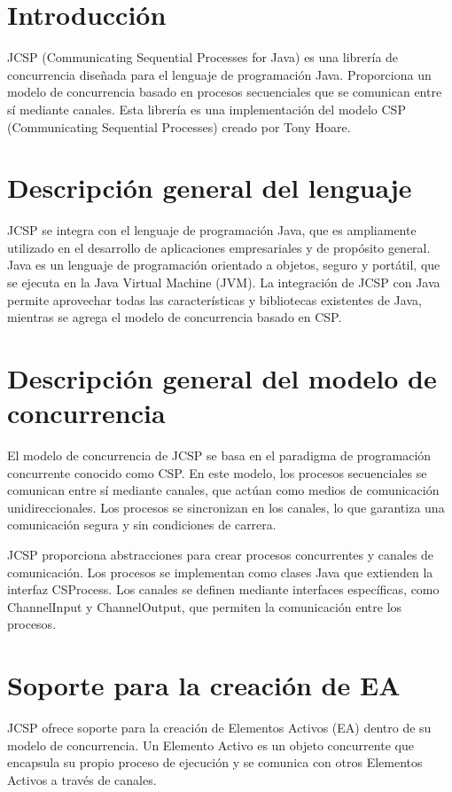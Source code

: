 \section*{Introducción}

JCSP (Communicating Sequential Processes for Java) es una librería de concurrencia diseñada para el lenguaje de programación Java. Proporciona un modelo de concurrencia basado en procesos secuenciales que se comunican entre sí mediante canales. Esta librería es una implementación del modelo CSP (Communicating Sequential Processes) creado por Tony Hoare.

\section*{Descripción general del lenguaje}
JCSP se integra con el lenguaje de programación Java, que es ampliamente utilizado en el desarrollo de aplicaciones empresariales y de propósito general. Java es un lenguaje de programación orientado a objetos, seguro y portátil, que se ejecuta en la Java Virtual Machine (JVM). La integración de JCSP con Java permite aprovechar todas las características y bibliotecas existentes de Java, mientras se agrega el modelo de concurrencia basado en CSP.

\section*{Descripción general del modelo de concurrencia}
El modelo de concurrencia de JCSP se basa en el paradigma de programación concurrente conocido como CSP. En este modelo, los procesos secuenciales se comunican entre sí mediante canales, que actúan como medios de comunicación unidireccionales. Los procesos se sincronizan en los canales, lo que garantiza una comunicación segura y sin condiciones de carrera.

JCSP proporciona abstracciones para crear procesos concurrentes y canales de comunicación. Los procesos se implementan como clases Java que extienden la interfaz CSProcess. Los canales se definen mediante interfaces específicas, como ChannelInput y ChannelOutput, que permiten la comunicación entre los procesos.

\section*{Soporte para la creación de EA}
JCSP ofrece soporte para la creación de Elementos Activos (EA) dentro de su modelo de concurrencia. Un Elemento Activo es un objeto concurrente que encapsula su propio proceso de ejecución y se comunica con otros Elementos Activos a través de canales.

